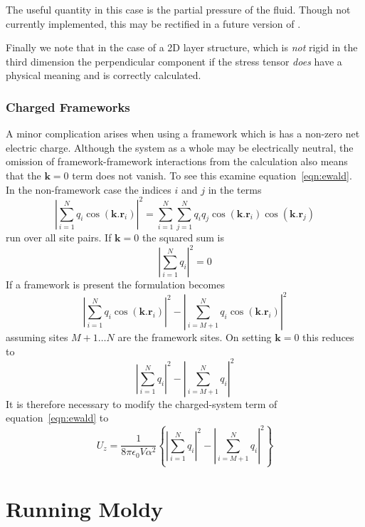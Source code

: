 The useful quantity in this case is the partial pressure of the
fluid.  Though not currently implemented, this may be rectified in a
future version of \moldy.

Finally we note that in the case of a 2D layer structure, which is
{\em not\/} rigid in the third dimension the perpendicular component if
the stress tensor {\em does\/} have a physical meaning and is correctly
calculated. 
 
\subsection{Charged Frameworks}
A minor complication arises when using a framework which is has a
non-zero net electric charge.  Although the system as a whole may be
electrically neutral, the omission of  framework-framework
interactions from the calculation also means that the
$\bm{k}=0$ term does not vanish.  To see this examine
equation~\ref{eqn:ewald}.  In the non-framework case the indices $i$
and $j$ in the terms
\begin{displaymath}
\left | \sum_{i=1}^{N} q_i \cos(\bm{k.r}_i) \right |^2 
=
\sum_{i=1}^{N} \sum_{j=1}^{N} q_i q_j \cos(\bm{k.r}_i)\cos(\bm{k.r}_j)
\end{displaymath}
run over all site pairs.  If $\bm{k}=0$
the squared sum is 
\begin{displaymath}
\left | \sum_{i=1}^{N} q_i \right |^2 = 0
\end{displaymath}
If a framework is present the formulation becomes
\begin{displaymath}
\left | \sum_{i=1}^{N} q_i \cos(\bm{k.r}_i) \right |^2 
-
\left | \sum_{i=M\!+\!1}^{N} q_i \cos(\bm{k.r}_i) \right |^2 
\end{displaymath}
assuming sites $M+1 \ldots N$ are the framework sites.  On setting
$\bm{k}=0$ this reduces to
\begin{displaymath}
\left | \sum_{i=1}^N q_i \right |^2 - \left | \sum_{i=M\!+\!1}^N q_i \right |^2
\end{displaymath}
It is therefore necessary to modify the charged-system term of
equation~\ref{eqn:ewald} to
\begin{equation}
U_z = \frac{1}{8 \pi \epsilon_0 V \alpha^2}
\left \lbrace
\left | \sum_{i=1}^N q_i \right |^2 - \left | \sum_{i=M\!+\!1}^N q_i \right |^2
\right \rbrace
\end{equation}
\chapter{Running Moldy}  %

